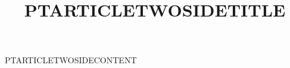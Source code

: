 \documentclass[twoside,nominted]{pt-article}
\title{PTARTICLETWOSIDETITLE}
\begin{document}
\noindent PTARTICLETWOSIDECONTENT
\end{document}
